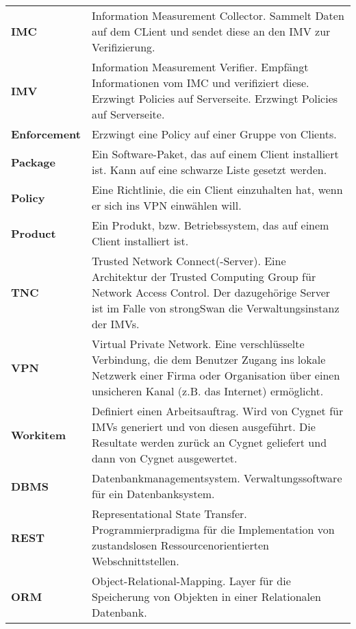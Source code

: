 \renewcommand{\arraystretch}{1.5}
\begin{longtable}{ll}
\textbf{IMC} & Information Measurement Collector. Sammelt Daten auf dem CLient und sendet diese an den IMV zur Verifizierung.\\

\textbf{IMV} & Information Measurement Verifier. Empfängt Informationen vom IMC und verifiziert diese. Erzwingt Policies auf Serverseite. Erzwingt Policies auf Serverseite.\\

\textbf{Enforcement} & Erzwingt eine Policy auf einer Gruppe von Clients.\\

\textbf{Package} & Ein Software-Paket, das auf einem Client installiert ist. Kann auf eine schwarze Liste
gesetzt werden.\\

\textbf{Policy} & Eine Richtlinie, die ein Client einzuhalten hat, wenn er sich ins VPN einwählen will.\\

\textbf{Product} & Ein Produkt, bzw. Betriebssystem, das auf einem Client installiert ist.\\

\textbf{TNC} & Trusted Network Connect(-Server). Eine Architektur der Trusted Computing Group für
Network Access Control. Der dazugehörige Server ist im Falle von strongSwan die
Verwaltungsinstanz der IMVs.\\

\textbf{VPN }& Virtual Private Network. Eine verschlüsselte Verbindung, die dem Benutzer Zugang ins
lokale Netzwerk einer Firma oder Organisation über einen unsicheren Kanal (z.B. das
Internet) ermöglicht.\\
 
\textbf{Workitem} & Definiert einen Arbeitsauftrag. Wird von Cygnet für IMVs generiert und von diesen
ausgeführt. Die Resultate werden zurück an Cygnet geliefert und dann von Cygnet
ausgewertet.\\
 
\textbf{DBMS} & Datenbankmanagementsystem. Verwaltungssoftware für ein Datenbanksystem.\\

\textbf{REST} & Representational State Transfer. Programmierpradigma für die Implementation von zustandslosen Ressourcenorientierten Webschnittstellen.\\

\textbf{ORM} & Object-Relational-Mapping. Layer für die Speicherung von Objekten in einer Relationalen Datenbank.\\


\end{longtable}
